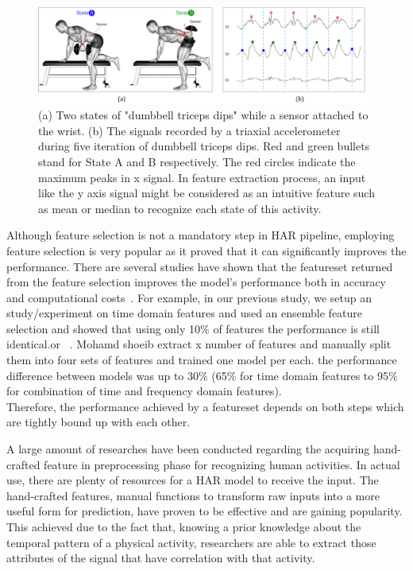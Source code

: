 \documentclass[journal,article,submit,moreauthors,pdftex]{Definitions/mdpi}
\begin{document}
\begin{figure}[H]
	\centering
	\includegraphics[width=14 cm]{Definitions/images/hand_craft_intuition.jpg}
	\caption{(a) Two states of "dumbbell triceps dips" while a sensor attached to the wrist. (b) The signals recorded by a triaxial accelerometer during five iteration of dumbbell triceps dips. Red and green bullets stand for State A and B respectively. The red circles indicate the maximum peaks in x signal. In feature extraction process, an input like the y axis signal might be considered as an intuitive feature such as mean or median to recognize each state of this activity.}
	\label{fig:feature_intuition}
\end{figure} 


Although feature selection is not a mandatory step in HAR pipeline, employing feature selection is very popular as it proved that it can significantly improves the performance. There are several studies have shown that the featureset returned from the feature selection improves the model's performance both in accuracy and computational costs~\cite{rosati2018comparison, Nourani_CoMoRea2019, wang2019survey}. For example, in our previous study, we setup an study/experiment on time domain features and used an ensemble feature selection and showed that using only 10\% of features the performance is still identical.or ~\cite{yazdansepas2016multi}. Mohamd shoeib extract x number of features and manually split them into four sets of features and trained one model per each. the performance difference between models was up to 30\% (65\% for time domain features to 95\% for combination of time and frequency domain features).\\
Therefore, the performance achieved by a featureset depends on both steps which are tightly bound up with each other. 


A large amount of researches have been conducted regarding the acquiring hand-crafted feature in preprocessing phase for recognizing human activities. In actual use, there are plenty of resources for a HAR model to receive the input. The hand-crafted features, manual functions to transform raw inputs into a more useful form for prediction, have proven to be effective and are gaining popularity\cite{wang2019survey}. This achieved due to the fact that, knowing a prior knowledge about the temporal pattern of a physical activity, researchers are able to extract those attributes of the signal that have correlation with that activity. 
\end{document}
